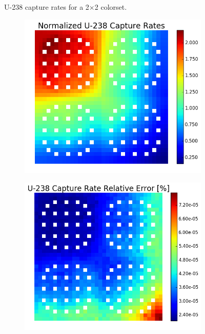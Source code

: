 \begin{figure}[h!]
\begin{subfigure}{0.5\textwidth}
  \caption{}
  \label{fig:chap7-capt-rate-rel-err-2x2}
\end{subfigure}%
\caption[U-238 capture rates for a 2$\times$2 colorset]{U-238 capture rates for a 2$\times$2 colorset.}
\label{fig:chap7-capt-rates-2x2}
\end{figure}

\begin{figure}[h!]
\centering
\begin{subfigure}{0.5\textwidth}
  \centering
  \includegraphics[width=\linewidth]{figures/benchmarks/capture-rates/capt-mean-reflector}
  \caption{}
  \label{fig:chap7-capt-rate-mean-reflector}
\end{subfigure}%
\begin{subfigure}{0.5\textwidth}
  \centering
  \includegraphics[width=\linewidth]{figures/benchmarks/capture-rates/capt-rel-err-reflector}

\end{subfigure}
\end{figure}
